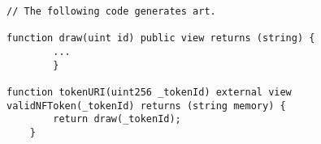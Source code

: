 \begin{lstlisting}[language=Solidity, basicstyle=\scriptsize]
// The following code generates art.

function draw(uint id) public view returns (string) {
		...
		}

function tokenURI(uint256 _tokenId) external view validNFToken(_tokenId) returns (string memory) {
        return draw(_tokenId);
    }
 
 \end{lstlisting}